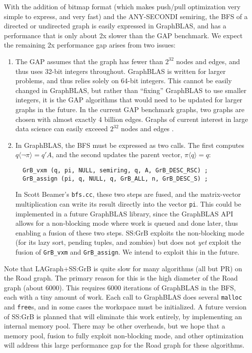 With the addition of bitmap format (which makes push/pull optimization very
simple to express, and very fast) and the ANY-SECONDI semiring, the BFS of a
directed or undirected graph is easily expressed in GraphBLAS, and has a
performance that is only about 2x slower than the GAP benchmark.  We expect
the remaining 2x performance gap arises from two issues:

\begin{enumerate}
\item
The GAP assumes that the graph has fewer than $2^{32}$ nodes and edges, and
thus uses 32-bit integers throughout.  GraphBLAS is written for larger
problems, and thus relies solely on 64-bit integers.  This cannot be easily
changed in GraphBLAS, but rather than ``fixing'' GraphBLAS to use smaller
integers, it is the GAP algorithms that would need to be updated for larger
graphs in the future.  In the current GAP benchmark graphs, two graphs are
chosen with almost exactly 4 billion edges.  Graphs of current interest in
large data science can easily exceeed $2^{32}$ nodes and edges \cite{9286235}.

\item In GraphBLAS, the BFS must be expressed as two calls.  The first computes
$q \langle \neg \pi \rangle = q'A$, and the second updates the parent vector,
$ \pi \langle q \rangle = q$:

{\footnotesize
\begin{verbatim}
  GrB_vxm (q, pi, NULL, semiring, q, A, GrB_DESC_RSC) ;
  GrB_assign (pi, q, NULL, q, GrB_ALL, n, GrB_DESC_S) ; \end{verbatim}}

In Scott Beamer's \verb'bfs.cc', these two steps are fused, and the
matrix-vector multiplication can write its result directly into the vector
\verb'pi'.  This could be implemented in a future GraphBLAS library, since the
GraphBLAS API allows for a non-blocking mode where work is queued and done
later, thus enabling a fusion of these two steps.  SS:GrB exploits the
non-blocking mode (for its lazy sort, pending tuples, and zombies) but does not
{\em yet} exploit the fusion of \verb'GrB_vxm' and \verb'GrB_assign'.  We
intend to exploit this in the future.
\end{enumerate}

Note that LAGraph+SS:GrB is quite slow for many algorithms (all but PR) on the
Road graph.  The primary reason for this is the high diameter of the Road graph
(about 6000).  This requires 6000 iterations of GraphBLAS in the BFS, each with
a tiny amount of work.  Each call to GraphBLAS does several \verb'malloc' and
\verb'free's, and in some cases the workspace must be initialized.  A future
version of SS:GrB is planned that will eliminate this work entirely, by
implementing an internal memory pool.  There may be other overheads, but we
hope that a memory pool, fusion to fully exploit non-blocking mode, and other
optimization will address this large performance gap for the Road graph for
these algorithms.


